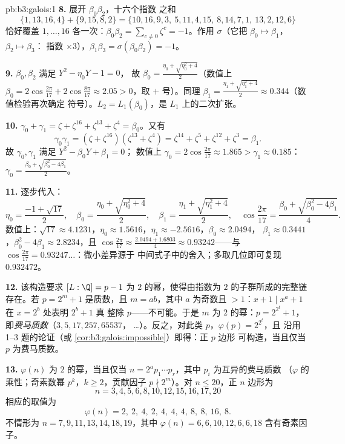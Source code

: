 \begin{solution}{pb:b3:galois:1}
\textbf{8.} 展开 $\beta_0\beta_2$，十六个指数
之和
\[
\{1,13,16,4\} + \{9,15,8,2\} =
\{10,16,9,3,\ 5,11,4,15,\ 8,14,7,1,\ 13,2,12,6\}
\]
恰好覆盖 $1, \dots, 16$ 各一次：$\beta_0\beta_2 =
\sum_{c\ne0}\zeta^c = -1$。作用 $\sigma$（它把
$\beta_0 \mapsto \beta_1$，$\beta_2 \mapsto \beta_3$：
指数 $\times 3$），$\beta_1\beta_3 = \sigma(\beta_0\beta_2)
= -1$。

\textbf{9.} $\beta_0, \beta_2$ 满足 $Y^2 - \eta_0 Y - 1 = 0$，
故 $\beta_0 = \frac{\eta_0 + \sqrt{\eta_0^2 + 4}}2$（数值上
$\beta_0 = 2\cos\frac{2\pi}{17} + 2\cos\frac{8\pi}{17} \approx
2.05 > 0$，取 $+$ 号）。同理 $\beta_1 = \frac{\eta_1 +
\sqrt{\eta_1^2 + 4}}2 \approx 0.344$（数值检验再次确定
符号）。$L_2 = L_1(\beta_0)$，是 $L_1$ 上的二次扩张。

\textbf{10.} $\gamma_0 + \gamma_1 = \zeta + \zeta^{16} +
\zeta^{13} + \zeta^4 = \beta_0$。又有
\[
\gamma_0\gamma_1 = (\zeta + \zeta^{16})(\zeta^{13} + \zeta^4)
= \zeta^{14} + \zeta^{5} + \zeta^{12} + \zeta^{3} = \beta_1 .
\]
故 $\gamma_0, \gamma_1$ 满足 $Y^2 - \beta_0Y + \beta_1 = 0$；
数值上 $\gamma_0 = 2\cos\frac{2\pi}{17} \approx 1.865 >
\gamma_1 \approx 0.185$：$\gamma_0 = \frac{\beta_0 +
\sqrt{\beta_0^2 - 4\beta_1}}2$。

\textbf{11.} 逐步代入：
\[
\eta_0 = \frac{-1 + \sqrt{17}}2,
\quad
\beta_0 = \frac{\eta_0 + \sqrt{\eta_0^2 + 4}}2,
\quad
\beta_1 = \frac{\eta_1 + \sqrt{\eta_1^2 + 4}}2,
\quad
\cos\frac{2\pi}{17} = \frac{\beta_0 + \sqrt{\beta_0^2 -
4\beta_1}}4 .
\]
数值上：$\sqrt{17} \approx 4.1231$，$\eta_0 \approx
1.5616$，$\eta_1 \approx -2.5616$，$\beta_0 \approx 2.0494$，
$\beta_1 \approx 0.3441$，$\beta_0^2 - 4\beta_1 \approx
2.8234$，且 $\cos\frac{2\pi}{17} \approx \frac{2.0494 +
1.6803}4 \approx 0.93242$——与 $\cos\frac{2\pi}{17} =
0.93247\dots$：微小差异源于
中间式子中的舍入；多取几位即可复现
$0.932472$。

\textbf{12.} 该构造要求 $[L:\Q] = p - 1$ 为
$2$ 的幂，使得由指数为 $2$ 的子群所成的完整链
存在。若 $p = 2^m + 1$ 是质数，且 $m = ab$，其中 $a$ 为奇数且 $>
1$：$x + 1 \mid x^a + 1$ 在 $x = 2^b$ 处表明 $2^b + 1$ 真
整除 $p$——不可能。于是 $m$ 为 $2$ 的幂：$p =
2^{2^t} + 1$，即\emph{费马质数}（$3, 5, 17, 257, 65537$，
\dots）。反之，对此类 $p$，$\varphi(p) = 2^{2^t}$，且
沿用 1--3 题的论证（或
\cref{cor:b3:galois:impossible}）即得：正 $p$ 边形
可构造，当且仅当 $p$ 为费马质数。

\textbf{13.} $\varphi(n)$ 为 $2$ 的幂，当且仅当 $n =
2^a p_1\cdots p_r$，其中 $p_i$ 为互异的费马质数
（$\varphi$ 的乘性；奇素数幂 $p^k$，$k
\geq 2$，贡献因子 $p \nmid 2^m$）。对 $n \leq
20$，正 $n$ 边形为
\[
n = 3, 4, 5, 6, 8, 10, 12, 15, 16, 17, 20
\]
相应的取值为
\[
\varphi(n) = 2,\ 2,\ 4,\ 2,\ 4,\ 4,\ 4,\ 8,\ 8,\ 16,\ 8 .
\]
不情形为 $n = 7, 9, 11, 13, 14, 18, 19$，其中
$\varphi(n) = 6, 6, 10, 12, 6, 6, 18$ 含有奇素因子。


\end{solution}
